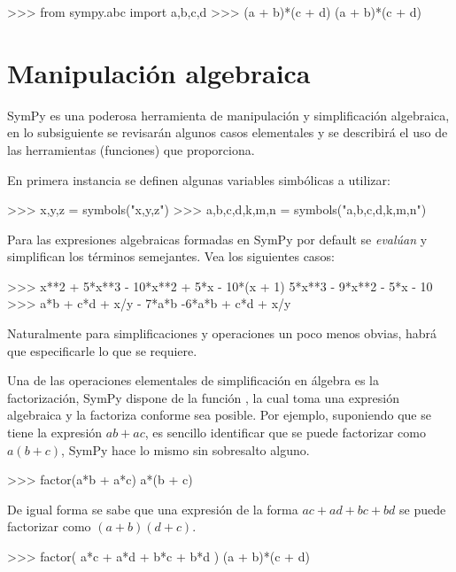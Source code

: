 \begin{python}
>>> from sympy.abc import a,b,c,d
>>> (a + b)*(c + d)
(a + b)*(c + d)
\end{python}


\section{Manipulación algebraica}

SymPy es una poderosa herramienta de manipulación y simplificación algebraica, en lo subsiguiente se revisarán 
algunos casos elementales y se describirá el uso de las herramientas (funciones) que proporciona.

En primera instancia se definen algunas variables simbólicas a utilizar:

\begin{python}
>>> x,y,z = symbols("x,y,z")
>>> a,b,c,d,k,m,n = symbols("a,b,c,d,k,m,n")
\end{python}

Para las expresiones algebraicas formadas en SymPy por default se \textit{evalúan} y simplifican los términos semejantes. 
Vea los siguientes casos:

\begin{python}
>>> x**2 + 5*x**3 - 10*x**2 + 5*x - 10*(x + 1)
5*x**3 - 9*x**2 - 5*x - 10
>>> a*b + c*d + x/y - 7*a*b
-6*a*b + c*d + x/y
\end{python}

Naturalmente para simplificaciones y operaciones un poco menos obvias, habrá que especificarle lo que se requiere.

Una de las operaciones elementales de simplificación en álgebra es la factorización, SymPy dispone de la 
función , la cual toma una expresión algebraica y la factoriza conforme sea posible. 
Por ejemplo, suponiendo que se tiene la expresión $ab + ac$, es sencillo identificar que se puede  
factorizar como $a(b+c)$, SymPy hace lo mismo sin sobresalto alguno.

\begin{python}
>>> factor(a*b + a*c)
a*(b + c)
\end{python}

De igual forma se sabe que una expresión de la forma $ ac + ad + bc + bd $ se puede factorizar como 
$ (a + b) (d + c) $.

\begin{python}
>>> factor( a*c + a*d + b*c + b*d )
(a + b)*(c + d)
\end{python}

